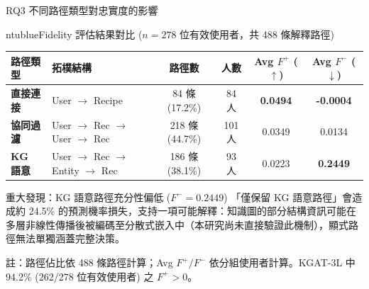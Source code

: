 \documentclass[aspectratio=169, 10pt]{beamer}
\begin{document}
\begin{frame}{RQ3 不同路徑類型對忠實度的影響}
  \begin{mybox}{ntublue}{{Fidelity 評估結果對比 ($n=278$ 位有效使用者，共 488 條解釋路徑)}}
    \centering
    \vspace{0.05cm}
    \footnotesize
    \setlength{\tabcolsep}{1.8pt}
    \begin{tabular}{l l c c c c}
      \toprule
      \textbf{路徑類型} & \textbf{拓樸結構} & \textbf{路徑數} & \textbf{人數} & \textbf{Avg $F^+$ ($\uparrow$)} & \textbf{Avg $F^-$ ($\downarrow$)} \\
      \midrule
      \textbf{直接連接} & User $\to$ Recipe & 84 條 (17.2\%) & 84 人 & \textbf{0.0494} & \textbf{-0.0004} \\
      \textbf{協同過濾} & User $\to$ Rec $\to$ User $\to$ Rec & 218 條 (44.7\%) & 101 人 & 0.0349 & 0.0134 \\
      \textbf{KG 語意} & User $\to$ Rec $\to$ Entity $\to$ Rec & 186 條 (38.1\%) & 93 人 & 0.0223 & \textbf{0.2449} \\
      \bottomrule
    \end{tabular}
    \vspace{0.05cm}
  \end{mybox}

  \vspace{0.15cm}
  \begin{alertblock}{重大發現：KG 語意路徑充分性偏低 ($F^- = 0.2449$)}
    「僅保留 KG 語意路徑」會造成約 24.5\% 的預測機率損失，支持一項可能解釋：知識圖的部分結構資訊可能在多層非線性傳播後被編碼至分散式嵌入中（本研究尚未直接驗證此機制），顯式路徑無法單獨涵蓋完整決策。
  \end{alertblock}
  \vspace{0.05cm}
  {\tiny *註：路徑佔比依 488 條路徑計算；Avg $F^+/F^-$ 依分組使用者計算。KGAT-3L 中 94.2\% (262/278 位有效使用者) 之 $F^+ > 0$。}
\end{frame}
\end{document}
